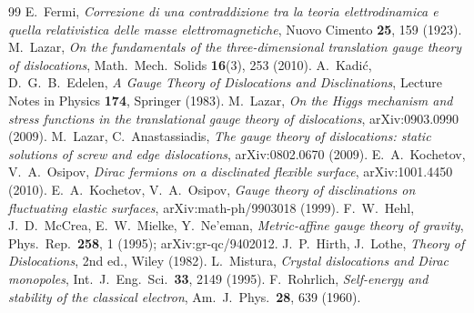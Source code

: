 \documentclass[12pt,a4paper]{article}
\begin{document}
\begin{thebibliography}{99}
 E.~Fermi, \emph{Correzione di una contraddizione tra la teoria
elettrodinamica e quella relativistica delle masse elettromagnetiche},
Nuovo Cimento \textbf{25}, 159 (1923).
 M.~Lazar, \emph{On the fundamentals of the three-dimensional
translation gauge theory of dislocations}, Math.\ Mech.\ Solids \textbf{16}(3), 253 (2010).
 A.~Kadi\'c, D.~G.~B.~Edelen, \emph{A Gauge Theory of Dislocations
and Disclinations}, Lecture Notes in Physics \textbf{174}, Springer (1983).
 M.~Lazar, \emph{On the Higgs mechanism and stress functions in the
translational gauge theory of dislocations}, arXiv:0903.0990 (2009).
 M.~Lazar, C.~Anastassiadis, \emph{The gauge theory of dislocations:
static solutions of screw and edge dislocations}, arXiv:0802.0670 (2009).
 E.~A.~Kochetov, V.~A.~Osipov, \emph{Dirac fermions on a disclinated
flexible surface}, arXiv:1001.4450 (2010).
 E.~A.~Kochetov, V.~A.~Osipov, \emph{Gauge theory of disclinations on
fluctuating elastic surfaces}, arXiv:math-ph/9903018 (1999).
 F.~W.~Hehl, J.~D.~McCrea, E.~W.~Mielke, Y.~Ne'eman, \emph{Metric-affine
gauge theory of gravity}, Phys.\ Rep.\ \textbf{258}, 1 (1995); arXiv:gr-qc/9402012.
 J.~P.~Hirth, J.~Lothe, \emph{Theory of Dislocations}, 2nd ed.,
Wiley (1982).
 L.~Mistura, \emph{Crystal dislocations and Dirac monopoles},
Int.\ J.\ Eng.\ Sci.\ \textbf{33}, 2149 (1995).
 F.~Rohrlich, \emph{Self-energy and stability of the classical
electron}, Am.\ J.\ Phys.\ \textbf{28}, 639 (1960).
\end{thebibliography}
\end{document}
